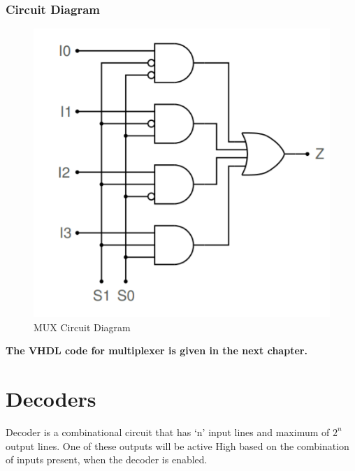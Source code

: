 \documentclass{report}
\begin{document}
\subsubsection{Circuit Diagram}
\begin{figure}[h]
    \centering
    \includegraphics[scale=0.5]{mux_cir.png}
    \caption{MUX Circuit Diagram}
    \label{fig:my_label}
\end{figure} 
\textbf{The VHDL code for multiplexer is given in the next chapter.}
\newpage
\section{Decoders}
Decoder is a combinational circuit that has ‘n’ input lines and maximum of $2^n$ output lines. One of these outputs will be active High based on the combination of inputs present, when the decoder is enabled.
\end{document}
